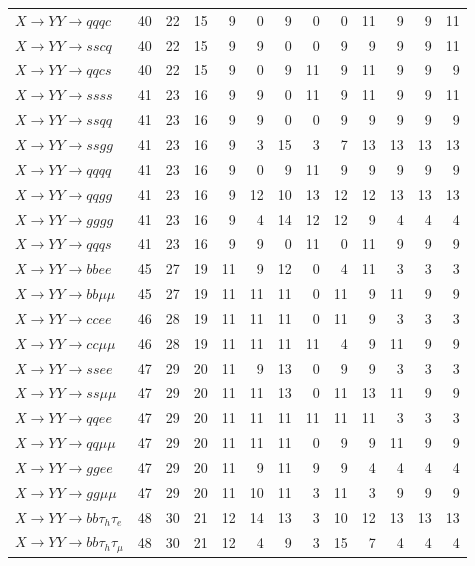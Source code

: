 {\begin{longtable}{l rrrrrrrrrrrr}
$X\to YY\to qqqc$ & 40 & 22 & 15 & 9 & 0 & 9 & 0 & 0 & 11 & 9 & 9 & 11 \\
$X\to YY\to sscq$ & 40 & 22 & 15 & 9 & 9 & 0 & 0 & 9 & 9 & 9 & 9 & 11 \\
$X\to YY\to qqcs$ & 40 & 22 & 15 & 9 & 0 & 9 & 11 & 9 & 11 & 9 & 9 & 9 \\
$X\to YY\to ssss$ & 41 & 23 & 16 & 9 & 9 & 0 & 11 & 9 & 11 & 9 & 9 & 11 \\
$X\to YY\to ssqq$ & 41 & 23 & 16 & 9 & 9 & 0 & 0 & 9 & 9 & 9 & 9 & 9 \\
$X\to YY\to ssgg$ & 41 & 23 & 16 & 9 & 3 & 15 & 3 & 7 & 13 & 13 & 13 & 13 \\
$X\to YY\to qqqq$ & 41 & 23 & 16 & 9 & 0 & 9 & 11 & 9 & 9 & 9 & 9 & 9 \\
$X\to YY\to qqgg$ & 41 & 23 & 16 & 9 & 12 & 10 & 13 & 12 & 12 & 13 & 13 & 13 \\
$X\to YY\to gggg$ & 41 & 23 & 16 & 9 & 4 & 14 & 12 & 12 & 9 & 4 & 4 & 4 \\
$X\to YY\to qqqs$ & 41 & 23 & 16 & 9 & 9 & 0 & 11 & 0 & 11 & 9 & 9 & 9 \\
\addlinespace[2pt]
$X\to YY\to bbee$ & 45 & 27 & 19 & 11 & 9 & 12 & 0 & 4 & 11 & 3 & 3 & 3 \\
$X\to YY\to bb\mu\mu$ & 45 & 27 & 19 & 11 & 11 & 11 & 0 & 11 & 9 & 11 & 9 & 9 \\
$X\to YY\to ccee$ & 46 & 28 & 19 & 11 & 11 & 11 & 0 & 11 & 9 & 3 & 3 & 3 \\
$X\to YY\to cc\mu\mu$ & 46 & 28 & 19 & 11 & 11 & 11 & 11 & 4 & 9 & 11 & 9 & 9 \\
$X\to YY\to ssee$ & 47 & 29 & 20 & 11 & 9 & 13 & 0 & 9 & 9 & 3 & 3 & 3 \\
$X\to YY\to ss\mu\mu$ & 47 & 29 & 20 & 11 & 11 & 13 & 0 & 11 & 13 & 11 & 9 & 9 \\
$X\to YY\to qqee$ & 47 & 29 & 20 & 11 & 11 & 11 & 11 & 11 & 11 & 3 & 3 & 3 \\
$X\to YY\to qq\mu\mu$ & 47 & 29 & 20 & 11 & 11 & 11 & 0 & 9 & 9 & 11 & 9 & 9 \\
$X\to YY\to ggee$ & 47 & 29 & 20 & 11 & 9 & 11 & 9 & 9 & 4 & 4 & 4 & 4 \\
$X\to YY\to gg\mu\mu$ & 47 & 29 & 20 & 11 & 10 & 11 & 3 & 11 & 3 & 9 & 9 & 9 \\
\addlinespace[2pt]
$X\to YY\to bb\tau_h\tau_e$ & 48 & 30 & 21 & 12 & 14 & 13 & 3 & 10 & 12 & 13 & 13 & 13 \\
$X\to YY\to bb\tau_h\tau_\mu$ & 48 & 30 & 21 & 12 & 4 & 9 & 3 & 15 & 7 & 4 & 4 & 4 \\

\end{longtable}}
